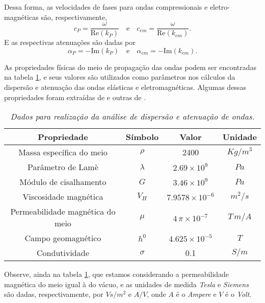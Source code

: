 Dessa forma, as velocidades de fases para ondas compressionais e eletro-magn\'eticas s\~ao, respectivamente,
\begin{equation*}
c_{P}=\frac{\omega}{\text{Re}(k_{P})}\quad\text{e}\quad c_{em}=\frac{\omega}{\text{Re}(k_{em})}.
\end{equation*}
E as respectivas atenua\c{c}\~oes s\~ao dadas por
\begin{equation*}
\alpha_{P}=-\text{Im}(k_{P})\quad\text{e}\quad \alpha_{em}=-\text{Im}(k_{em}).
\end{equation*}

As propriedades f\'isicas do meio de propaga\c{c}\~ao das ondas podem ser encontradas na tabela \ref{tab.dados_dispersao}, e seus valores s\~ao utilizados como par\^ametros nos c\'alculos da dispers\~ao e atenua\c{c}\~ao das ondas el\'asticas e eletromagn\'eticas. Algumas dessas propriedades foram extra\'idas de \cite{White_Zhou_2006} e outras de \cite{griffiths}.


\begin{table}
\begin{center}
\begin{tabular}{|c|c|c|c|}
\hline 
Propriedade & S\'imbolo & Valor & Unidade \\ 
\hline 
Massa espec\'ifica do meio & $\rho$ & 2400 & $Kg/m^3$ \\ 
\hline 
Par\^ametro de Lam\`e & $\lambda$ & $2.69\times 10^9$ & $Pa$ \\ 
\hline 
M\'odulo de cisalhamento & $G$ & $3.46\times 10^9$ & $Pa$ \\ 
\hline 
Viscosidade magn\'etica & $V_H$ & $7.9578\times 10^{-6}$ & $m^2/s$ \\ 
\hline 
Permeabilidade magn\'etica do meio & $\mu$ & $4\,\pi\times 10^{-7}$ & $T\,m/A$ \\ 
\hline 
Campo geomagn\'etico & $h^0$ & $4.625\times 10^{-5}$ & $T$ \\ 
\hline 
Condutividade & $\sigma$ & 0.1 & $S/m$ \\
\hline
\end{tabular}
\end{center}
\caption{\textit{Dados para realiza\c{c}\~ao da an\'alise de dispers\~ao e atenua\c{c}\~ao de ondas.}}
\label{tab.dados_dispersao}
\end{table}

Observe, ainda na tabela \ref{tab.dados_dispersao}, que estamos considerando a permeabilidade magn\'etica do meio igual \`a do v\'acuo, e as unidades de medida \textit{Tesla} e \textit{Siemens} s\~ao dadas, respectivamente, por $Vs/m^2$ e $A/V$, onde $A$ \'e o \textit{Ampere} e $V$ \'e o \textit{Volt}.

